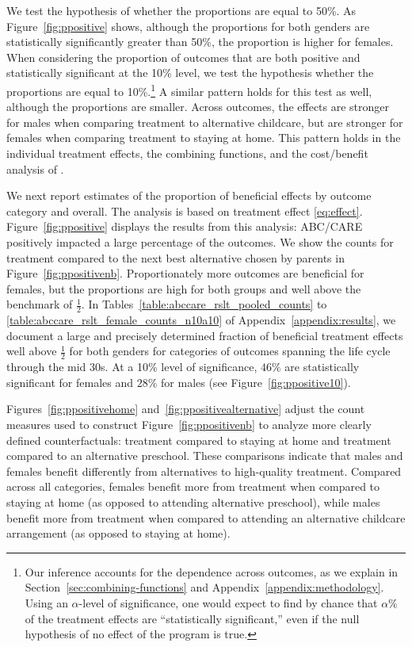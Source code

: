 We test the hypothesis of whether the proportions are equal to 50\%. As Figure~\ref{fig:ppositive} shows, although the proportions for both genders are statistically significantly greater than 50\%, the proportion is higher for females. When considering the proportion of outcomes that are both positive and statistically significant at the 10\% level, we test the hypothesis whether the proportions are equal to 10\%.\footnote{Our inference accounts for the dependence across outcomes, as we explain in Section~\ref{sec:combining-functions} and Appendix~\ref{appendix:methodology}. Using an $\alpha$-level of significance, one would expect to find by chance that $\alpha\%$ of the treatment effects are ``statistically significant,'' even if the null hypothesis of no effect of the program is true.} A similar pattern holds for this test as well, although the proportions are smaller. Across outcomes, the effects are stronger for males when comparing treatment to alternative childcare, but are stronger for females when comparing treatment to staying at home. This pattern holds in the individual treatment effects, the combining functions, and the cost/benefit analysis of \citet{Garcia_Heckman_Leaf_etal_2017_Comp_CBA_Unpublished}.

We next report estimates of the proportion of beneficial effects by outcome category and overall. The analysis is based on treatment effect \eqref{eq:effect}. Figure~\ref{fig:ppositive} displays the results from this analysis: ABC/CARE positively impacted a large percentage of the outcomes. We show the counts for treatment compared to the next best alternative chosen by parents in Figure~\ref{fig:ppositivenb}. Proportionately more outcomes are beneficial for females, but the proportions are high for both groups and well above the benchmark of $\frac{1}{2}$. In Tables~\ref{table:abccare_rslt_pooled_counts} to \ref{table:abccare_rslt_female_counts_n10a10} of Appendix~\ref{appendix:results}, we document a large and precisely determined fraction of beneficial treatment effects well above $\frac{1}{2}$ for both genders for categories of outcomes spanning the life cycle through the mid 30s. At a 10\% level of significance, $46\%$ are statistically significant for females and $28\%$ for males (see Figure~\ref{fig:ppositive10}).

Figures~\ref{fig:ppositivehome} and~\ref{fig:ppositivealternative} adjust the count measures used to construct Figure~\ref{fig:ppositivenb} to analyze more clearly defined counterfactuals: treatment compared to staying at home and treatment compared to an alternative preschool. These comparisons indicate that males and females benefit differently from alternatives to high-quality treatment. Compared across all categories, females benefit more from treatment when compared to staying at home (as opposed to attending alternative preschool), while males benefit more from treatment when compared to attending an alternative childcare arrangement (as opposed to staying at home).

